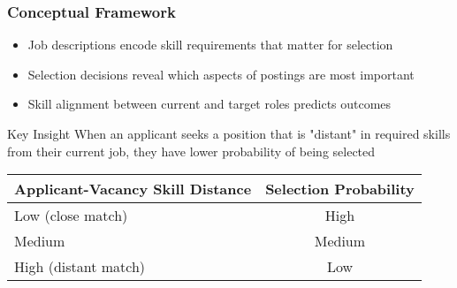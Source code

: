 \documentclass[aspectratio=169]{beamer}
\begin{document}
\begin{frame}
\frametitle{Conceptual Framework}

\begin{itemize}
\item Job descriptions encode skill requirements that matter for selection
\item Selection decisions reveal which aspects of postings are most important
\item Skill alignment between current and target roles predicts outcomes
\end{itemize}

\begin{block}{Key Insight}
When an applicant seeks a position that is "distant" in required skills from their current job, they have lower probability of being selected
\end{block}

\begin{center}
\begin{tabular}{|l|c|}
\hline
\textbf{Applicant-Vacancy Skill Distance} & \textbf{Selection Probability} \\
\hline
Low (close match) & High \\
Medium & Medium \\
High (distant match) & Low \\
\hline
\end{tabular}
\end{center}
\end{frame}

\end{document}
